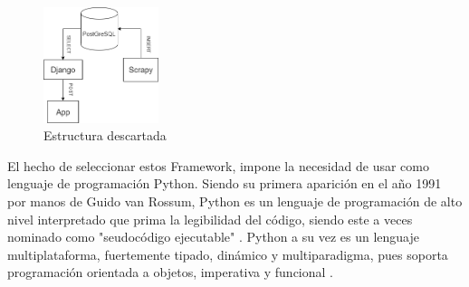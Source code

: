 \begin{figure} [H]
	\centering
	\includegraphics[width=0.3\textwidth]{fig/estructura_descartada.png}
	\caption[Idea original de la estructura de datos planteada]{Estructura descartada}
	\label{fig:ej9}
\end{figure}

El hecho de seleccionar estos Framework, impone la necesidad de usar como lenguaje de programación Python.\newline
\newline
Siendo su primera aparición en el año 1991 por manos de Guido van Rossum, Python es un lenguaje de programación de alto nivel interpretado que prima la legibilidad del código, siendo este a veces nominado como "seudocódigo ejecutable" \cite{dierbach2014python}. Python a su vez es un lenguaje multiplataforma, fuertemente tipado, dinámico y multiparadigma, pues soporta programación orientada a objetos, imperativa y funcional \cite{PyDoc} \cite{borges2014python}.\newline
\newline
